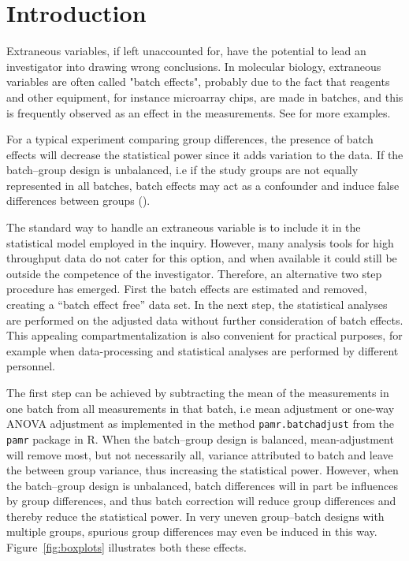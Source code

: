 \documentclass{bio}
\begin{document}
\section{Introduction}\label{intro}

Extraneous variables, if left unaccounted for, have the potential to lead an investigator into drawing wrong conclusions. In molecular biology, extraneous variables are often called "batch effects", probably due to the fact that reagents and other equipment, for instance microarray chips, are made in batches, and this is frequently observed as an effect in the measurements. See \citet{Luo2010} for more examples. 

For a typical experiment comparing group differences, the presence of batch effects will decrease the statistical power since it adds variation to the data. If the batch--group design is unbalanced, i.e if the study groups are not equally represented in all batches, batch effects may act as a confounder and induce false differences between groups (\citealp{Leek2010}).

The standard way to handle an extraneous variable is to include it in the statistical model employed in the inquiry. However, many analysis tools for high throughput data do not cater for this option, and when available it could still be outside the competence of the investigator. Therefore, an alternative two step procedure has emerged. First the batch effects are estimated and removed, creating a
``batch effect free'' data set. In the next step, the statistical analyses are performed on the adjusted data without further consideration of batch effects. This appealing compartmentalization is also convenient for practical purposes, for example when data-processing and statistical analyses are performed by different personnel.

The first step can be achieved by subtracting the mean of the measurements in one batch from all measurements in that batch, i.e mean adjustment or one-way ANOVA adjustment as implemented in the method \texttt{pamr.batchadjust} from the \texttt{pamr} package in R. When the batch--group design is balanced, mean-adjustment will remove most, but not necessarily all, variance attributed to batch and leave the between group variance, thus increasing the statistical power. However, when the batch--group design is unbalanced, batch differences will in part be influences by group differences, and thus batch correction will reduce group differences and thereby reduce the statistical power. In very uneven group--batch designs with multiple groups, spurious group differences may even be induced in this way. Figure~\ref{fig:boxplots} illustrates both these effects.
\end{document}
